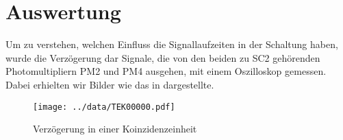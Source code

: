 \section{Auswertung}
Um zu verstehen, welchen Einfluss die Signallaufzeiten in der Schaltung haben,
wurde die Verzögerung dar Signale, die von den beiden zu SC2 gehörenden
Photomultipliern PM2 und PM4 ausgehen, mit einem Oszilloskop gemessen. Dabei
erhielten wir Bilder wie das in  dargestellte.

\begin{figure}[htb]
   \centering
   \texttt{[image: ../data/TEK00000.pdf]}
   \caption{Verzögerung in einer Koinzidenzeinheit}
   \label{fig:koinzidenz}
\end{figure}